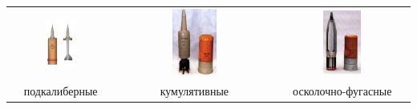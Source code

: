 \centering

\begin{tabular}{ccc}

\includegraphics[width=0.3\textwidth]{images/boecom1} &

\includegraphics[width=0.3\textwidth]{images/boecom2} &

\includegraphics[width=0.3\textwidth]{images/boecom3} \\

подкалиберные &
кумулятивные &
осколочно-фугасные \\

\end{tabular}

